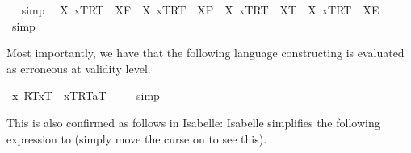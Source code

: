 \begin{isabellebody}
\isadelimproof
\ %
\endisadelimproof
%
\isatagproof
{}\isamarkupfalse%
\ simp\ \isamarkupfalse%
%
\endisatagproof
{\isafoldproof}%
%
\isadelimproof
%
\endisadelimproof
\isanewline
{}\isamarkupfalse%
\ {\isachardoublequoteopen}{\isasymexists}X{\isachardot}\ {\isasymlbrace}x\isactrlsup T{\isacharcomma}R\isactrlsup T{\isasymrbrace}\ {\isacharequal}\ {\isacharparenleft}X\isactrlsup F{\isacharparenright}\ {\isasymand}\ {\isasymnot}{\isacharparenleft}{\isasymexists}X{\isachardot}\ {\isasymlbrace}x\isactrlsup T{\isacharcomma}R\isactrlsup T{\isasymrbrace}\ {\isacharequal}\ {\isacharparenleft}X\isactrlsup P{\isacharparenright}{\isacharparenright}\ {\isasymand}\ {\isasymnot}{\isacharparenleft}{\isasymexists}X{\isachardot}\ {\isasymlbrace}x\isactrlsup T{\isacharcomma}R\isactrlsup T{\isasymrbrace}\ {\isacharequal}\ {\isacharparenleft}X\isactrlsup T{\isacharparenright}{\isacharparenright}\ {\isasymand}\ {\isasymnot}{\isacharparenleft}{\isasymexists}X{\isachardot}\ {\isasymlbrace}x\isactrlsup T{\isacharcomma}R\isactrlsup T{\isasymrbrace}\ {\isacharequal}\ {\isacharparenleft}X\isactrlsup E{\isacharparenright}{\isacharparenright}{\isachardoublequoteclose}%
\isadelimproof
\ %
\endisadelimproof
%
\isatagproof
{}\isamarkupfalse%
\ simp\ \isamarkupfalse%
%
\endisatagproof
{\isafoldproof}%
%
\isadelimproof
%
\endisadelimproof
%
\begin{isamarkuptext}%
Most importantly, we have that the following language constructing is evaluated as erroneous at validity
 level.%
\end{isamarkuptext}%
\isamarkuptrue%
\isamarkupfalse%
\ {\isachardoublequoteopen}{\isacharbrackleft}{\isasymlparr}\isactrlbold {\isasymlambda}x{\isachardot}\ {\isasymlparr}R\isactrlsup T{\isacharcomma}x\isactrlsup T{\isasymrparr}\ \isactrlbold {\isasymrightarrow}\ {\isasymlbrace}x\isactrlsup T{\isacharcomma}R\isactrlsup T{\isasymrbrace}{\isacharcomma}a\isactrlsup T{\isasymrparr}{\isacharbrackright}\ {\isacharequal}\ {\isacharasterisk}{\isachardoublequoteclose}%
\isadelimproof
\ %
\endisadelimproof
%
\isatagproof
{}\isamarkupfalse%
\ simp\ \isamarkupfalse%
%
\endisatagproof
{\isafoldproof}%
%
\isadelimproof
%
\endisadelimproof
%
\begin{isamarkuptext}%
This is also confirmed as follows in Isabelle: Isabelle simplifies the following expression
 to  (simply move the curse on  to see this).%
\end{isamarkuptext}%

\end{isabellebody}
